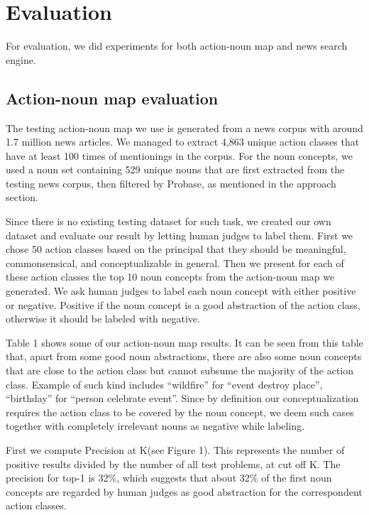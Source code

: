 \section{Evaluation}

For evaluation, we did experiments for both action-noun map and news search engine.

\subsection{Action-noun map evaluation}
The testing action-noun map we use is generated from a news corpus with around 1.7 million
news articles. We managed to extract 4,863 unique action classes that have at least 100 times of mentionings
in the corpus.
For the noun concepts, we used a noun set containing 529 unique nouns that are first extracted from
the testing news corpus, then filtered by Probase, as mentioned in the approach section.

Since there is no existing testing dataset for such task, we created our own dataset and evaluate
our result by letting human judges to label them.
First we chose 50 action classes based on the principal that they should be meaningful, commonsensical, and
conceptualizable in general. Then we present for each of these action classes the top 10 noun concepts from
the action-noun map we generated. We ask human judges to label each noun concept with either positive or negative.
Positive if the noun concept is a good abstraction of the action class, otherwise it should be labeled with negative.

Table 1 shows some of our action-noun map results.
It can be seen from this table that, apart from some good noun abstractions, there are also some noun concepts
that are close to the action class but cannot subsume the majority of the action class.
Example of such kind includes ``wildfire'' for ``event destroy place'', ``birthday'' for ``person
celebrate event''. Since by definition our conceptualization requires the action class to be covered by the noun concept,
we deem such cases together with completely irrelevant nouns as negative while labeling.

First we compute Precision at K(see Figure 1). This represents the number of positive results divided by the number of all test problems,
at cut off K. The precision for top-1 is 32\%, which suggests that about 32\% of the first noun concepts are regarded by human judges as
good abstraction for the correspondent action classes.


